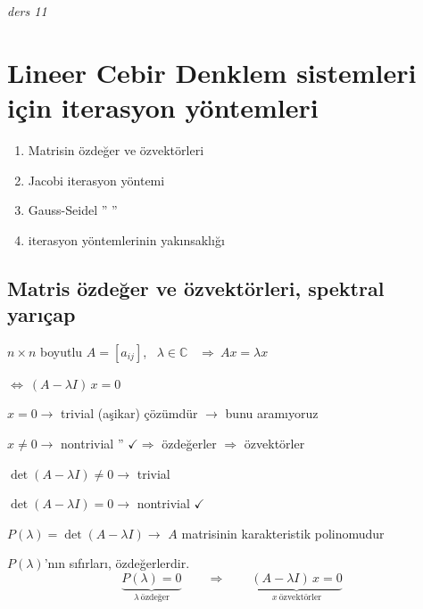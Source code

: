 \documentclass[11pt,a4paper]{article}
\begin{document}

\noindent\textit{ders 11}

\section{Lineer Cebir Denklem sistemleri için iterasyon yöntemleri}
\begin{enumerate}[label=\arabic*-]
  \item Matrisin özdeğer ve özvektörleri
  \item Jacobi iterasyon yöntemi
  \item Gauss-Seidel \quad '' \qquad ''
  \item iterasyon yöntemlerinin yakınsaklığı
\end{enumerate}

\subsection{Matris özdeğer ve özvektörleri, spektral yarıçap}
$n\times n$ boyutlu $A=[a_{ij}]$, \ $\lambda\in\mathbb{C}$ \ $\Rightarrow\ Ax=\lambda x$

$\Leftrightarrow\ (A-\lambda I)\,x=0$

$x=0 \rightarrow$ trivial (aşikar) çözümdür $\rightarrow$ bunu aramıyoruz

$x\neq 0 \rightarrow$ nontrivial \quad '' \quad $\checkmark \Rightarrow$ özdeğerler $\Rightarrow$ özvektörler

\medskip
$\det(A-\lambda I)\neq 0 \rightarrow$ trivial

$\det(A-\lambda I)=0 \rightarrow$ nontrivial $\checkmark$

$P(\lambda)=\det(A-\lambda I) \rightarrow$ $A$ matrisinin karakteristik polinomudur

$P(\lambda)$'nın sıfırları, özdeğerlerdir.
\[
  \underbrace{P(\lambda)=0}_{\lambda\ \text{özdeğer}}
  \qquad\Rightarrow\qquad
  \underbrace{(A-\lambda I)\,x=0}_{x\ \text{özvektörler}}
\]
\end{document}

